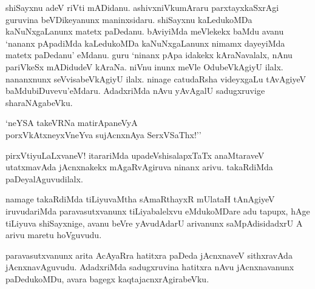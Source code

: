 shiSayxnu adeV riVti mADidanu. ashivxniVkumAraru parxtayxkaSxrAgi guruvina beVDikeyanunx maninxsidaru. shiSayxnu kaLedukoMDa kaNuNxgaLanunx matetx paDedanu. bAviyiMda meVlekekx baMdu avanu `nananx pApadiMda kaLedukoMDa kaNuNxgaLanunx nimamx dayeyiMda matetx paDedanu' eMdanu. guru `ninanx pApa idakekx kAraNavalalx, nAnu pariVkeSx mADidudeV kAraNa. niVnu inunx meVle OdubeVkAgiyU ilalx. nananxnunx seVvisabeVkAgiyU ilalx. ninage catudaRsha videyxgaLu tAvAgiyeV baMdubiDuvevu'eMdaru. AdadxriMda nAvu yAvAgalU sadugxruvige sharaNAgabeVku.

\begin{shloka}
`neYSA takeVRNa matirApaneVyA\\
porxVkAtxneyxVneYva sujAcnxnAya SerxVSaThx!''
\end{shloka}


pirxVtiyuLaLxvaneV! itarariMda upadeVshisalapxTaTx anaMtaraveV utatxmavAda jAcnxnakekx mAgaRvAgiruva ninanx arivu. takaRdiMda paDeyalAguvudilalx.

namage takaRdiMda tiLiyuvaMtha sAmaRthayxR mUlataH tAnAgiyeV iruvudariMda paravasutxvanunx tiLiyabalelxvu eMdukoMDare adu tapupx, hAge tiLiyuva shiSayxnige, avanu beVre yAvudAdarU arivanunx saMpAdisidadxrU A arivu maretu hoVguvudu. 

paravasutxvanunx arita AcAyaRra hatitxra paDeda jAcnxnaveV sithxravAda jAcnxnavAguvudu. AdadxriMda sadugxruvina hatitxra nAvu jAcnxnavanunx paDedukoMDu, avara bagegx kaqtajacnxrAgirabeVku.




\endchapter

